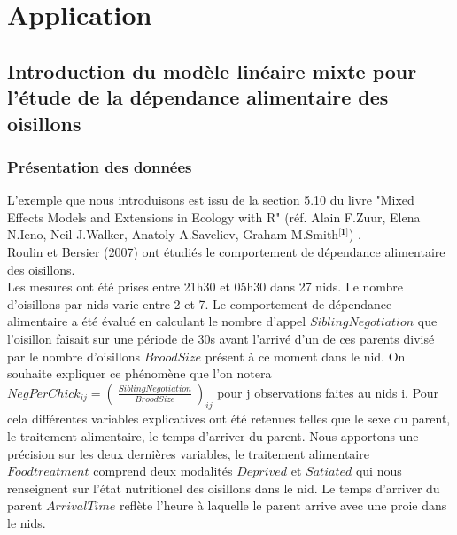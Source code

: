 \documentclass[11pt,fleqn]{book} %
\begin{document}
\newpage



\chapter{Application}


\section{Introduction du modèle linéaire mixte pour l'étude de la dépendance alimentaire des oisillons}

\vspace{2em}

\subsection{Présentation des données}

\vspace{1em}

L'exemple que nous introduisons est issu de la section 5.10 du livre "Mixed Effects Models and Extensions in Ecology with R" (réf. Alain F.Zuur, Elena N.Ieno, Neil J.Walker, Anatoly A.Saveliev, Graham M.Smith$^{\textbf{[1]}}$) .\\ 
Roulin et Bersier (2007) ont étudiés le comportement de dépendance alimentaire des oisillons.\\
Les mesures ont été prises entre 21h30 et 05h30 dans 27 nids. Le nombre d'oisillons par nids varie entre 2 et 7. Le comportement de dépendance alimentaire a été évalué en calculant le nombre d'appel $SiblingNegotiation$ que l'oisillon faisait sur une période de 30s avant l'arrivé d'un de ces parents divisé par le nombre d'oisillons $BroodSize$ présent à ce moment dans le nid. On souhaite expliquer ce phénomène que l'on notera $NegPerChick_{ij}=\left(\:\frac{SiblingNegotiation}{BroodSize}\:\right)_{ij}$ pour j observations faites au nids i. Pour cela différentes variables explicatives ont été retenues telles que le sexe du parent, le traitement alimentaire, le temps d'arriver du parent. Nous apportons une précision sur les deux dernières variables, le traitement alimentaire $Foodtreatment$ comprend deux modalités $Deprived$ et $Satiated$ qui nous renseignent sur l'état nutritionel des oisillons dans le nid. Le temps d'arriver du parent $ArrivalTime$  reflète l'heure à laquelle le parent arrive avec une proie dans le nids.
\end{document}
